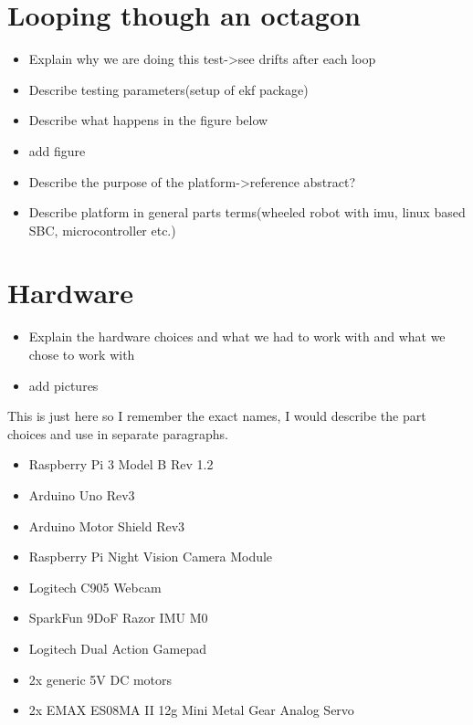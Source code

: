 \section{Looping though an octagon}\label{sec:octagon}

\begin{itemize}
 \item Explain why we are doing this test->see drifts after each loop
 \item Describe testing parameters(setup of ekf package)
 \item Describe what happens in the figure below
 \item add figure
\end{itemize}


\begin{itemize}
 \item Describe the purpose of the platform->reference abstract?
 \item Describe platform in general parts terms(wheeled robot with imu, linux based SBC, microcontroller etc.)
\end{itemize}

\section{Hardware}
\pagestyle{scrheadings}

\begin{itemize}
 \item Explain the hardware choices and what we had to work with and what we chose to work with
 \item add pictures
\end{itemize}

This is just here so I remember the exact names, I would describe the part choices and use in separate paragraphs.
\begin{itemize}
 \item Raspberry Pi 3 Model B Rev 1.2
 \item Arduino Uno Rev3
 \item Arduino Motor Shield Rev3
 \item Raspberry Pi Night Vision Camera Module
 \item Logitech C905 Webcam
 \item SparkFun 9DoF Razor IMU M0
 \item Logitech Dual Action Gamepad
 \item 2x generic 5V DC motors
 \item 2x EMAX ES08MA II 12g Mini Metal Gear Analog Servo
\end{itemize}

